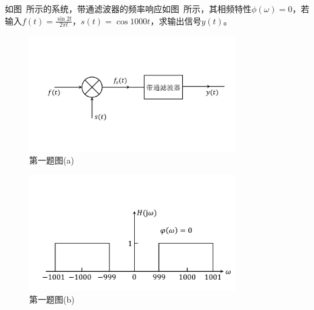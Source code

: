 \documentclass[answers]{exam}
\begin{document}
\Large

\begin{questions}



\question 如图~\label{fig:q1-1}所示的系统，带通滤波器的频率响应如图~\label{fig:q1-2}所示，其相频特性$\phi(\omega)=0$，若输入$f(t)=\frac{\sin 2t}{2\pi t}$，$s(t)=\cos 1000t$，求输出信号$y(t)$。
\begin{figure}
	\centering
	\includegraphics[width=0.8\textwidth]{pics/q1-1.pdf}
	\caption{第一题图(a)}
	\label{fig:q1-1}
\end{figure}
\begin{figure}
	\centering
	\includegraphics[width=0.8\textwidth]{pics/q1-2.pdf}
	\caption{第一题图(b)}
	\label{fig:11-2}
\end{figure}


\end{questions}
\end{document}
